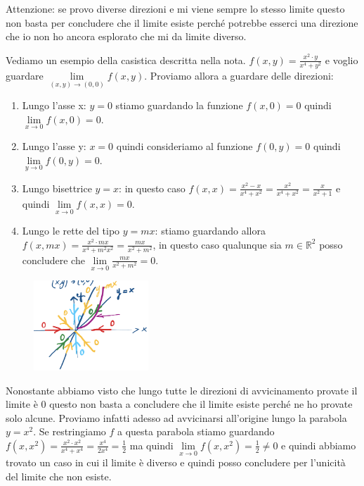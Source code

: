 \begin{note}
Attenzione: se provo diverse direzioni e mi viene sempre lo stesso limite questo non basta per concludere che il limite esiste perché potrebbe esserci una direzione che io non ho ancora esplorato che mi da limite diverso.
\end{note}

\begin{example}
Vediamo un esempio della casistica descritta nella nota. $f(x,y) = \frac{x^2 \cdot y}{x^4 + y^2}$ e voglio guardare $\lim\limits_{(x,y) \to (0,0)}f(x,y)$. Proviamo allora a guardare delle direzioni:
\begin{enumerate}
    \item Lungo l'asse x: $y = 0$ stiamo guardando la funzione $f(x,0) = 0$ quindi $\lim\limits_{x\to 0}f(x,0) = 0$.
    \item Lungo l'asse y: $x = 0$ quindi consideriamo al funzione $f(0,y) = 0$ quindi $\lim\limits_{y \to 0}f(0,y) = 0$.
    \item Lungo bisettrice $y= x$: in questo caso $f(x,x) = \frac{x^2 - x}{x^4 + x^2} = \frac{x^2}{x^4 + x^2} = \frac{x}{x^2 + 1}$ e quindi $\lim\limits_{x\to 0}f(x,x) = 0$.
    \item Lungo le rette del tipo $y = mx$: stiamo guardando allora $f(x,mx) = \frac{x^2 \cdot mx}{x^4 + m^2x^2} = \frac{mx}{x^2 + m^2}$, in questo caso qualunque sia $m \in \mathbb{R}^2$ posso concludere che $\lim\limits_{x\to 0}\frac{mx}{x^2 + m^2} = 0$.
\end{enumerate}
\end{example}
\begin{figure}
    \vspace{-10pt}
    \centering
    \includegraphics[width=4.3cm]{images/ess-lim-2var-3.png}
\end{figure}
Nonostante abbiamo visto che lungo tutte le direzioni di avvicinamento provate il limite è 0 questo non basta a concludere che il limite esiste perché ne ho provate solo alcune. Proviamo infatti adesso ad avvicinarsi all'origine lungo la parabola $y = x^2$. Se restringiamo $f$ a questa parabola stiamo guardando $f(x, x^2) = \frac{x^2 \cdot x^2}{x^4 + x^4} = \frac{x^4}{2x^4}= \frac{1}{2}$ ma quindi $\lim\limits_{x\to 0}f(x, x^2) = \frac{1}{2} \neq 0$ e quindi abbiamo trovato un caso in cui il limite è diverso e quindi posso concludere per l'unicità del limite che non esiste.


